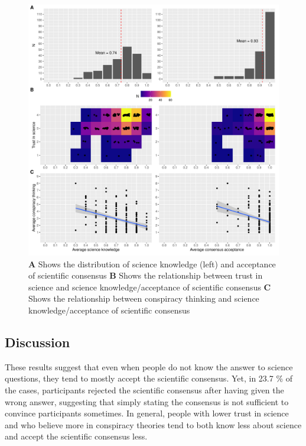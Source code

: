 \documentclass[
  doc,floatsintext]{apa6}
\begin{document}
\begin{figure}
\centering
\includegraphics{output/figures/exp1-plot.pdf}
\caption{\label{fig:exp1-plot}\textbf{A} Shows the distribution of science knowledge (left) and acceptance of scientific consensus \textbf{B} Shows the relationship between trust in science and science knowledge/acceptance of scientific consensus \textbf{C} Shows the relationship between conspiracy thinking and science knowledge/acceptance of scientific consensus}
\end{figure}

\hypertarget{discussion}{%
\subsection{Discussion}\label{discussion}}

These results suggest that even when people do not know the answer to science questions, they tend to mostly accept the scientific consensus. Yet, in 23.7 \% of the cases, participants rejected the scientific consensus after having given the wrong answer, suggesting that simply stating the consensus is not sufficient to convince participants sometimes. In general, people with lower trust in science and who believe more in conspiracy theories tend to both know less about science and accept the scientific consensus less.
\end{document}
